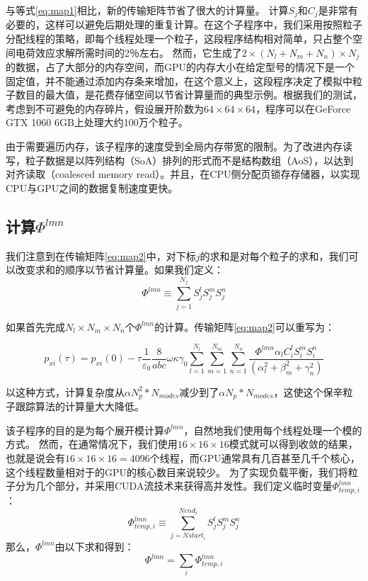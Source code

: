 与等式\ref{eq:map1}相比，新的传输矩阵节省了很大的计算量。
计算$ S_ {j} $和$ C_ {j}$是非常有必要的，这样可以避免后期处理的重复计算。在这个子程序中，我们采用按照粒子分配线程的策略，即每个线程处理一个粒子，这段程序结构相对简单，只占整个空间电荷效应求解所需时间的2％左右。 然而，它生成了$ 2 \times({{N}_{l}} + {{N}_{m}} + {{N}_{n}})\times {{N} _ {j}} $ 的数据，占了大部分的内存空间，而GPU的内存大小在给定型号的情况下是一个固定值，并不能通过添加内存条来增加，在这个意义上，这段程序决定了模拟中粒子数目的最大值，是花费存储空间以节省计算量而的典型示例。根据我们的测试，考虑到不可避免的内存碎片，假设展开阶数为$64\times64\times64$，程序可以在GeForce GTX 1060 6GB上处理大约100万个粒子。

由于需要遍历内存，该子程序的速度受到全局内存带宽的限制。为了改进内存读写，粒子数据是以阵列结构（SoA）排列的形式而不是结构数组（AoS），以达到对齐读取（coalesced memory read）。并且，在CPU侧分配页锁存存储器，以实现 CPU与GPU之间的数据复制速度更快。

\subsection{计算$\Phi^{lmn}$}\label{section:phi}
我们注意到在传输矩阵\ref{eq:map2}中，对下标$j$的求和是对每个粒子的求和，我们可以改变求和的顺序以节省计算量。如果我们定义：
\begin{equation}
\Phi^{lmn}\equiv \sum\limits_{j=1}^{{{N}_{j}}}{S_{j}^{l}S_{j}^{m}S_{j}^{n}}
\end{equation}

如果首先完成${{N}_{l}}\times{{N}_{m}}\times{{N}_{n}}$个$\Phi^{lmn}$的计算。传输矩阵\ref{eq:map2}可以重写为：

\begin{equation}\label{eq:map3}
{{p}_{xi}}(\tau )={{p}_{xi}}(0)-\tau \frac{1}{{{\varepsilon }_{0}}}\frac{8}{abc}\omega \kappa {{\gamma }_{0}}\sum\limits_{l=1}^{{{N}_{l}}}{\sum\limits_{m=1}^{{{N}_{m}}}{\sum\limits_{n=1}^{{{N}_{n}}}{\frac{\Phi^{lmn}{{\alpha }_{l}}C_{i}^{l}S_{i}^{m}S_{i}^{n}}{(\alpha _{l}^{2}+\beta _{m}^{2}+\gamma _{n}^{2})}}}}
\end{equation}

以这种方式，计算复杂度从$\alpha N_p^2*N_{modes}$减少到了$\alpha  N_p*N_{modes}$，这使这个保辛粒子跟踪算法的计算量大大降低。

该子程序的目的是为每个展开模计算$\Phi^{lmn}$，自然地我们使用每个线程处理一个模的方式。
然而，在通常情况下，我们使用$16\times 16\times 16$模式就可以得到收敛的结果，也就是说会有$16\times 16\times 16 = 4096$个线程，而GPU通常具有几百甚至几千个核心，这个线程数量相对于的GPU的核心数目来说较少。
为了实现负载平衡，我们将粒子分为几个部分，并采用CUDA流技术来获得高并发性。我们定义临时变量$\Phi^{lmn}_{temp,i}$：
\begin{equation}
\Phi^{lmn}_{temp,i}\equiv \sum\limits_{j=Nstar{{t}_{i}}}^{Nen{{d}_{i}}}{S_{j}^{l}S_{j}^{m}S_{j}^{n}}
\end{equation}
那么，$\Phi^{lmn}$由以下求和得到：
\begin{equation}
\Phi^{lmn}=\sum\limits_{i}{\Phi^{lmn}_{temp,i}}
\end{equation}

